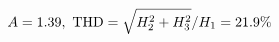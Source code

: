 \documentclass[preview]{standalone}
\begin{document}
\begin{align*}
\special{dvisvgm:raw <g id='unique000'>}A=1.39,\ \text{THD}=\sqrt{H_2^2+H_3^2}/H_1=21.9\%\special{dvisvgm:raw </g>}
\end{align*}
\end{document}
